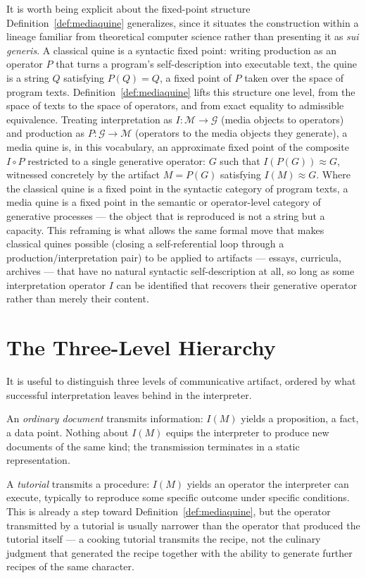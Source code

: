 \documentclass[11pt]{book}
\begin{document}
It is worth being explicit about the fixed-point structure Definition~\ref{def:mediaquine} generalizes, since it situates the construction within a lineage familiar from theoretical computer science rather than presenting it as \emph{sui generis}. A classical quine is a syntactic fixed point: writing production as an operator $P$ that turns a program's self-description into executable text, the quine is a string $Q$ satisfying $P(Q) = Q$, a fixed point of $P$ taken over the space of program texts. Definition~\ref{def:mediaquine} lifts this structure one level, from the space of texts to the space of operators, and from exact equality to admissible equivalence. Treating interpretation as $I:\mathcal{M}\to\mathcal{G}$ (media objects to operators) and production as $P:\mathcal{G}\to\mathcal{M}$ (operators to the media objects they generate), a media quine is, in this vocabulary, an approximate fixed point of the composite $I\circ P$ restricted to a single generative operator: $G$ such that $I(P(G)) \approx G$, witnessed concretely by the artifact $M = P(G)$ satisfying $I(M)\approx G$. Where the classical quine is a fixed point in the syntactic category of program texts, a media quine is a fixed point in the semantic or operator-level category of generative processes --- the object that is reproduced is not a string but a capacity. This reframing is what allows the same formal move that makes classical quines possible (closing a self-referential loop through a production/interpretation pair) to be applied to artifacts --- essays, curricula, archives --- that have no natural syntactic self-description at all, so long as some interpretation operator $I$ can be identified that recovers their generative operator rather than merely their content.

\section{The Three-Level Hierarchy}

It is useful to distinguish three levels of communicative artifact, ordered by what successful interpretation leaves behind in the interpreter.

An \emph{ordinary document} transmits information: $I(M)$ yields a proposition, a fact, a data point. Nothing about $I(M)$ equips the interpreter to produce new documents of the same kind; the transmission terminates in a static representation.

A \emph{tutorial} transmits a procedure: $I(M)$ yields an operator the interpreter can execute, typically to reproduce some specific outcome under specific conditions. This is already a step toward Definition~\ref{def:mediaquine}, but the operator transmitted by a tutorial is usually narrower than the operator that produced the tutorial itself --- a cooking tutorial transmits the recipe, not the culinary judgment that generated the recipe together with the ability to generate further recipes of the same character.
\end{document}
